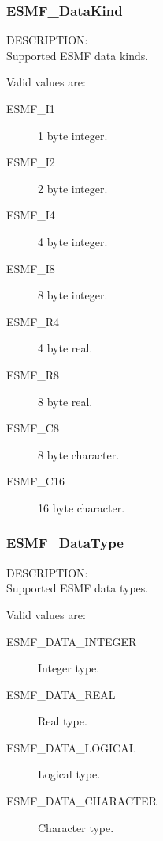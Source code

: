 \subsubsection{ESMF\_DataKind}

{\sf DESCRIPTION:\\}
Supported ESMF data kinds.

Valid values are:
\begin{description}
\item [ESMF\_I1]
      1 byte integer.
\item [ESMF\_I2]
      2 byte integer.
\item [ESMF\_I4]
      4 byte integer.
\item [ESMF\_I8]
      8 byte integer.
\item [ESMF\_R4]
      4 byte real.
\item [ESMF\_R8]
      8 byte real.
\item [ESMF\_C8]
      8 byte character.
\item [ESMF\_C16]
      16 byte character.
\end{description}

\subsubsection{ESMF\_DataType}

{\sf DESCRIPTION:\\}
Supported ESMF data types.

Valid values are:
\begin{description}
\item [ESMF\_DATA\_INTEGER]
      Integer type.
\item [ESMF\_DATA\_REAL]
      Real type.
\item [ESMF\_DATA\_LOGICAL]
      Logical type.
\item [ESMF\_DATA\_CHARACTER]
      Character type.
\end{description}









